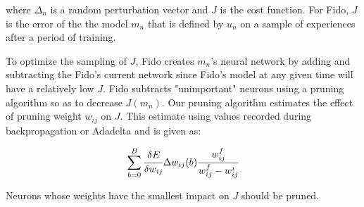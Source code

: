 \noindent

where $\Delta_n$ is a random perturbation vector and $J$ is the cost function. For Fido, $J$ is the error of the the model $m_n$ that is defined by $u_n$ on a sample of experiences after a period of training.

To optimize the sampling of $J$, Fido creates $m_n$'s neural network by adding and subtracting the Fido's current network since Fido's model at any given time will have a relatively low $J$. Fido subtracts "unimportant" neurons using a pruning algorithm \cite{reed} so as to decrease $J(m_n)$. Our pruning algorithm estimates the effect of pruning weight $w_{ij}$ on $J$. This estimate using values recorded during backpropagation or Adadelta  and is given as:

\begin{equation}
	\sum_{b=0}^{B}\cfrac{\delta E}{\delta w_{ij}}\Delta w_{ij}(b)\cfrac{w^f_{ij}}{w^f_{ij}-w^i_{ij}}
	\label{equ::sensitivity}
\end{equation}

Neurons whose weights have the smallest impact on $J$ should be pruned.
